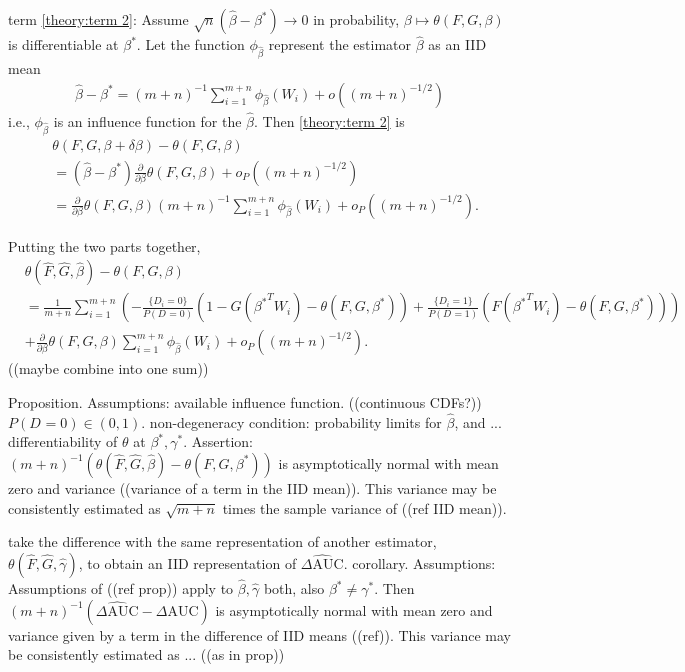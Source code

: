 \documentclass[12pt]{article}
\renewcommand{\P}{P}
\newcommand{\W}[1][]{W_{#1}}
\newcommand{\D}[1][]{D_{#1}}
\renewcommand{\t}[1]{{#1}^T}
\renewcommand{\star}[1]{{#1}^\ast}
\newcommand{\infl}[1][]{\phi_{#1}}
\newcommand{\F}{F}
\newcommand{\G}{G}
\newcommand{\m}{m}
\newcommand{\n}{n}
\newcommand{\N}{m+n}
\newcommand{\auc}{\theta}
\newcommand{\aucdiff}{\Delta\text{AUC}}
\newcommand{\aucdiffhat}{\hat{\Delta\text{AUC}}}
\theoremstyle{definition}
\begin{document}
term \eqref{theory:term 2}: Assume
$\sqrt{n}(\hat\beta-\star\beta)\to 0$ in probability,
$\beta\mapsto\auc(\F,\G,\beta)$ is differentiable at $\star\beta$. Let
the function $\infl[\hat\beta]$ represent the estimator $\hat\beta$ as
an IID mean
\begin{align}
  \hat\beta-\star\beta=(\N)^{-1}\sum_{i=1}^{\m+\n}\infl[\hat\beta](\W[i]) + o((\N)^{-1/2})
\end{align}
i.e., $\infl[\hat\beta]$ is an influence function for the $\hat\beta$. Then \eqref{theory:term 2} is
\begin{align}
  &\auc(\F,\G,\beta+\delta\beta)-\auc(\F,\G,\beta)  \\
  &=(\hat\beta-\star\beta)\frac{\partial}{\partial\beta}\auc(\F,\G,\beta) + o_P((\N)^{-1/2})\\
  &=\frac{\partial}{\partial\beta}\auc(\F,\G,\beta)(\N)^{-1}\sum_{i=1}^{\m+\n}\infl[\hat\beta](\W[i]) + o_P((\N)^{-1/2}).
\end{align}

Putting the two parts together,
\begin{align}
  &\auc(\hat\F,\hat\G,\hat\beta) - \auc(\F,\G,\beta)\\
  &=\frac{1}{\m+\n}\sum_{i=1}^{\m+\n}\left(-\frac{\{\D[i]=0\}}{\P(\D=0)}(1-\G(\t{\star\beta}\W[i])-\auc(\F,\G,\star\beta)) + \frac{\{\D[i]=1\}}{\P(\D=1)}(\F(\t{\star\beta}\W[i])-\auc(\F,\G,\star\beta))\right) \\
  &+ \frac{\partial}{\partial\beta}\auc(\F,\G,\beta)\sum_{i=1}^{\m+\n}\infl[\hat\beta](\W[i]) + o_P((\N)^{-1/2}).
\end{align}
((maybe combine into one sum))

Proposition.
Assumptions: available influence function. ((continuous
CDFs?)) $P(\D=0) \in (0,1)$. non-degeneracy condition: probability
limits for $\hat\beta$, and
... differentiability of $\auc$ at
$\star\beta,\star\gamma$.
Assertion: $(\N)^{-1}(\auc(\hat\F,\hat\G,\hat\beta)-\auc(\F,\G,\star\beta))$ is asymptotically normal with mean zero and variance ((variance of a term in the IID mean)). This variance may be consistently estimated as $\sqrt{\N}$ times the sample variance of ((ref IID mean)).

take the difference with the same representation of another estimator, $\auc(\hat\F,\hat\G,\hat\gamma)$, to obtain an IID representation of $\aucdiffhat$.
corollary.
Assumptions: Assumptions of ((ref prop)) apply to $\hat\beta,\hat\gamma$ both, also $\star\beta\neq\star\gamma$. Then $(\N)^{-1}(\aucdiffhat-\aucdiff)$ is asymptotically normal with mean zero and variance given by a term in the difference of IID means ((ref)). This variance may be consistently estimated as ... ((as in prop))
\end{document}
